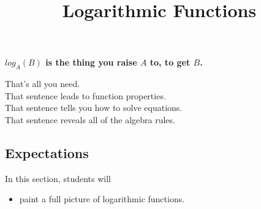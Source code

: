 \documentclass{ximera}
\title{Logarithmic Functions}
\begin{document}
\begin{abstract}
\end{abstract}
\maketitle





\begin{center}
\textbf{\textcolor{red!80!black}{$log_A(B)$ is the thing you raise $A$ to, to get $B$.}}
\end{center}


That's all you need. \\

That sentence leads to function properties. \\

That sentence tells you how to solve equations. \\

That sentence reveals all of the algebra rules. \\










\subsection{Expectations}


\begin{sectionOutcomes}
In this section, students will 

\begin{itemize}
\item paint a full picture of logarithmic functions.
\end{itemize}
\end{sectionOutcomes}
\end{document}

